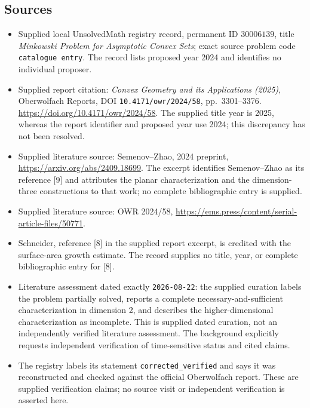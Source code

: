 \documentclass[11pt]{article}
\begin{document}
\subsection{Sources}
\begin{itemize}
\item Supplied local UnsolvedMath registry record, permanent ID \(30006139\), title \emph{Minkowski Problem for Asymptotic Convex Sets}; exact source problem code \texttt{catalogue entry}. The record lists proposed year 2024 and identifies no individual proposer.
\item Supplied report citation: \emph{Convex Geometry and its Applications (2025)}, Oberwolfach Reports, DOI \texttt{10.4171/owr/2024/58}, pp.\ 3301--3376. \url{https://doi.org/10.4171/owr/2024/58}. The supplied title year is 2025, whereas the report identifier and proposed year use 2024; this discrepancy has not been resolved.
\item Supplied literature source: Semenov--Zhao, 2024 preprint, \url{https://arxiv.org/abs/2409.18699}. The excerpt identifies Semenov--Zhao as its reference [9] and attributes the planar characterization and the dimension-three constructions to that work; no complete bibliographic entry is supplied.
\item Supplied literature source: OWR 2024/58, \url{https://ems.press/content/serial-article-files/50771}.
\item Schneider, reference [8] in the supplied report excerpt, is credited with the surface-area growth estimate. The record supplies no title, year, or complete bibliographic entry for [8].
\item Literature assessment dated exactly \texttt{2026-08-22}: the supplied curation labels the problem partially solved, reports a complete necessary-and-sufficient characterization in dimension 2, and describes the higher-dimensional characterization as incomplete. This is supplied dated curation, not an independently verified literature assessment. The background explicitly requests independent verification of time-sensitive status and cited claims.
\item The registry labels its statement \texttt{corrected\_verified} and says it was reconstructed and checked against the official Oberwolfach report. These are supplied verification claims; no source visit or independent verification is asserted here.
\end{itemize}
\end{document}

